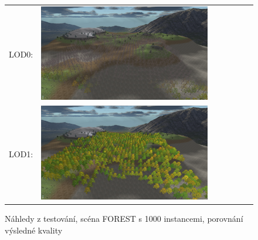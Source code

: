 \begin{figure}[!hbt]
\begin{tabular}{r l}
LOD0: & \includegraphics[width=0.8\textwidth]{./testing/LOD0only1000.png}\\
LOD1: & \includegraphics[width=0.8\textwidth]{./testing/LOD1only1000.png}\\
\end{tabular}
\caption[Náhledy testovací scény FOREST]%
{Náhledy z testování, scéna FOREST s 1000 instancemi, porovnání výsledné kvality \label{fig:testQuality}
}
\end{figure}

